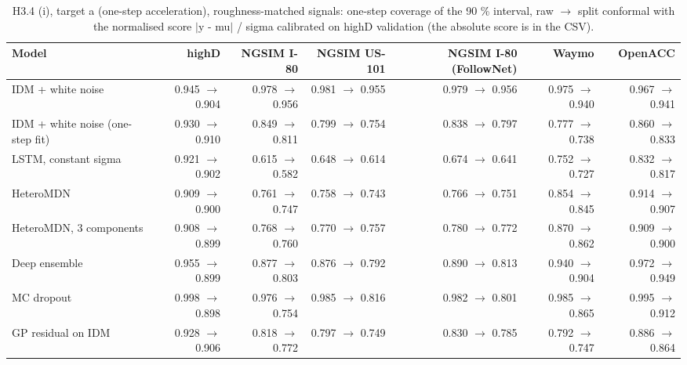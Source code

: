 \begin{table}[htbp]
\centering
\footnotesize
\caption{H3.4 (i), target a (one-step acceleration), roughness-matched signals: one-step coverage of the 90 \% interval, raw $\rightarrow$ split conformal with the normalised score $|$y - mu$|$ / sigma calibrated on highD validation (the absolute score is in the CSV).}
\label{tab:t4-onestep-conformal--matched--a}
\begin{tabular}{lrrrrrr}
\toprule
Model & highD & NGSIM I-80 & NGSIM US-101 & NGSIM I-80 (FollowNet) & Waymo & OpenACC \\
\midrule
IDM + white noise & 0.945 $\rightarrow$ 0.904 & 0.978 $\rightarrow$ 0.956 & 0.981 $\rightarrow$ 0.955 & 0.979 $\rightarrow$ 0.956 & 0.975 $\rightarrow$ 0.940 & 0.967 $\rightarrow$ 0.941 \\
IDM + white noise (one-step fit) & 0.930 $\rightarrow$ 0.910 & 0.849 $\rightarrow$ 0.811 & 0.799 $\rightarrow$ 0.754 & 0.838 $\rightarrow$ 0.797 & 0.777 $\rightarrow$ 0.738 & 0.860 $\rightarrow$ 0.833 \\
LSTM, constant sigma & 0.921 $\rightarrow$ 0.902 & 0.615 $\rightarrow$ 0.582 & 0.648 $\rightarrow$ 0.614 & 0.674 $\rightarrow$ 0.641 & 0.752 $\rightarrow$ 0.727 & 0.832 $\rightarrow$ 0.817 \\
HeteroMDN & 0.909 $\rightarrow$ 0.900 & 0.761 $\rightarrow$ 0.747 & 0.758 $\rightarrow$ 0.743 & 0.766 $\rightarrow$ 0.751 & 0.854 $\rightarrow$ 0.845 & 0.914 $\rightarrow$ 0.907 \\
HeteroMDN, 3 components & 0.908 $\rightarrow$ 0.899 & 0.768 $\rightarrow$ 0.760 & 0.770 $\rightarrow$ 0.757 & 0.780 $\rightarrow$ 0.772 & 0.870 $\rightarrow$ 0.862 & 0.909 $\rightarrow$ 0.900 \\
Deep ensemble & 0.955 $\rightarrow$ 0.899 & 0.877 $\rightarrow$ 0.803 & 0.876 $\rightarrow$ 0.792 & 0.890 $\rightarrow$ 0.813 & 0.940 $\rightarrow$ 0.904 & 0.972 $\rightarrow$ 0.949 \\
MC dropout & 0.998 $\rightarrow$ 0.898 & 0.976 $\rightarrow$ 0.754 & 0.985 $\rightarrow$ 0.816 & 0.982 $\rightarrow$ 0.801 & 0.985 $\rightarrow$ 0.865 & 0.995 $\rightarrow$ 0.912 \\
GP residual on IDM & 0.928 $\rightarrow$ 0.906 & 0.818 $\rightarrow$ 0.772 & 0.797 $\rightarrow$ 0.749 & 0.830 $\rightarrow$ 0.785 & 0.792 $\rightarrow$ 0.747 & 0.886 $\rightarrow$ 0.864 \\

\end{tabular}
\end{table}
